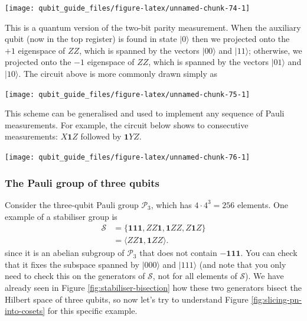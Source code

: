 \documentclass[fleqn,a4paper]{article}
\theoremstyle{definition}
\theoremstyle{definition}
\theoremstyle{definition}
\theoremstyle{definition}
\theoremstyle{remark}
\begin{document}
\begin{center}\texttt{[image: qubit\_guide\_files/figure-latex/unnamed-chunk-74-1]} \end{center}

This is a quantum version of the two-bit parity measurement.
When the auxiliary qubit (now in the top register) is found in state \(|0\rangle\) then we projected onto the \(+1\) eigenspace of \(ZZ\), which is spanned by the vectors \(|00\rangle\) and \(|11\rangle\); otherwise, we projected onto the \(-1\) eigenspace of \(ZZ\), which is spanned by the vectors \(|01\rangle\) and \(|10\rangle\).
The circuit above is more commonly drawn simply as

\begin{center}\texttt{[image: qubit\_guide\_files/figure-latex/unnamed-chunk-75-1]} \end{center}

This scheme can be generalised and used to implement any sequence of Pauli measurements.
For example, the circuit below shows to consecutive measurements: \(X\mathbf{1}Z\) followed by \(\mathbf{1}YZ\).

\begin{center}\texttt{[image: qubit\_guide\_files/figure-latex/unnamed-chunk-76-1]} \end{center}

\hypertarget{pauli-group-three-qubits-worked-example}{%
\subsubsection{The Pauli group of three qubits}\label{pauli-group-three-qubits-worked-example}}

Consider the three-qubit Pauli group \(\mathcal{P}_3\), which has \(4\cdot 4^3=256\) elements.
One example of a stabiliser group is
\[
  \begin{aligned}
    \mathcal{S}
    &= \{\mathbf{1}\mathbf{1}\mathbf{1},ZZ\mathbf{1},\mathbf{1}ZZ, Z\mathbf{1}Z\}
  \\&= \langle ZZ\mathbf{1},\mathbf{1}ZZ\rangle.
  \end{aligned}
\]
since it is an abelian subgroup of \(\mathcal{P}_3\) that does not contain \(-\mathbf{1}\mathbf{1}\mathbf{1}\).
You can check that it fixes the subspace spanned by \(|000\rangle\) and \(|111\rangle\) (and note that you only need to check this on the generators of \(\mathcal{S}\), not for all elements of \(\mathcal{S}\)).
We have already seen in Figure \ref{fig:stabiliser-bisection} how these two generators bisect the Hilbert space of three qubits, so now let's try to understand Figure \ref{fig:slicing-pn-into-cosets} for this specific example.
\end{document}
